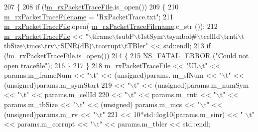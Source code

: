 \begin{DoxyCode}
207 \{
208         \textcolor{keywordflow}{if} (!\hyperlink{classns3_1_1MmWavePhyRxTrace_a07034985924a2a3d7f94264c374d89b0}{m\_rxPacketTraceFile}.is\_open())
209         \{
210                 \hyperlink{classns3_1_1MmWavePhyRxTrace_a77b3807d28e4e1e7422c2e15da797ee5}{m\_rxPacketTraceFilename} = \textcolor{stringliteral}{"RxPacketTrace.txt"};
211                 \hyperlink{classns3_1_1MmWavePhyRxTrace_a07034985924a2a3d7f94264c374d89b0}{m\_rxPacketTraceFile}.open(
      \hyperlink{classns3_1_1MmWavePhyRxTrace_a77b3807d28e4e1e7422c2e15da797ee5}{m\_rxPacketTraceFilename}.c\_str ());
212                 \hyperlink{classns3_1_1MmWavePhyRxTrace_a07034985924a2a3d7f94264c374d89b0}{m\_rxPacketTraceFile} << \textcolor{stringliteral}{"\(\backslash\)tframe\(\backslash\)tsubF\(\backslash\)t1stSym\(\backslash\)tsymbol#\(\backslash\)tcellId\(\backslash\)trnti\(\backslash\)t
      tbSize\(\backslash\)tmcs\(\backslash\)trv\(\backslash\)tSINR(dB)\(\backslash\)tcorrupt\(\backslash\)tTBler"} << std::endl;
213                 \textcolor{keywordflow}{if} (!\hyperlink{classns3_1_1MmWavePhyRxTrace_a07034985924a2a3d7f94264c374d89b0}{m\_rxPacketTraceFile}.is\_open())
214                 \{
215                         \hyperlink{group__fatal_ga5131d5e3f75d7d4cbfd706ac456fdc85}{NS\_FATAL\_ERROR} (\textcolor{stringliteral}{"Could not open tracefile"});
216                 \}
217         \}
218         \hyperlink{classns3_1_1MmWavePhyRxTrace_a07034985924a2a3d7f94264c374d89b0}{m\_rxPacketTraceFile} << \textcolor{stringliteral}{"UL\(\backslash\)t"} << params.m\_frameNum << \textcolor{stringliteral}{"\(\backslash\)t"} << (unsigned)params.
      m\_sfNum << \textcolor{stringliteral}{"\(\backslash\)t"} << (\textcolor{keywordtype}{unsigned})params.m\_symStart
219                                 << \textcolor{stringliteral}{"\(\backslash\)t"} << (unsigned)params.m\_numSym << \textcolor{stringliteral}{"\(\backslash\)t"} << params.m\_cellId
220                                 << \textcolor{stringliteral}{"\(\backslash\)t"} << params.m\_rnti << \textcolor{stringliteral}{"\(\backslash\)t"} << params.m\_tbSize << \textcolor{stringliteral}{"\(\backslash\)t"} << (\textcolor{keywordtype}{unsigned})
      params.m\_mcs << \textcolor{stringliteral}{"\(\backslash\)t"} << (unsigned)params.m\_rv << \textcolor{stringliteral}{"\(\backslash\)t"}
221                                 << 10*std::log10(params.m\_sinr) << \textcolor{stringliteral}{" \(\backslash\)t"} << params.m\_corrupt << \textcolor{stringliteral}{"\(\backslash\)t"} << 
      params.m\_tbler << std::endl;

\end{DoxyCode}
